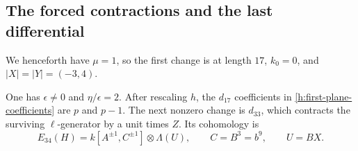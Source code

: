 \subsection{The forced contractions and the last differential}

We henceforth have $\mu=1$, so the first change is at length $17$,
$k_0=0$, and $|X|=|Y|=(-3,4)$.

\begin{lemma}
 \label{h:d17-d33}
 One has $\epsilon\ne0$ and $\eta/\epsilon=2$. After rescaling $h$,
 the $d_{17}$ coefficients in \eqref{h:first-plane-coefficients} are
 $p$ and $p-1$. The next nonzero change is $d_{33}$, which contracts
 the surviving $\ell$-generator by a unit times $Z$. Its cohomology
 is
 \begin{equation}
 \label{h:e34}
 E_{34}(H)=k[A^{\pm1},C^{\pm1}]\otimes\Lambda(U),
 \qquad C=B^3=b^9,\qquad U=BX.
 \end{equation}
\end{lemma}

